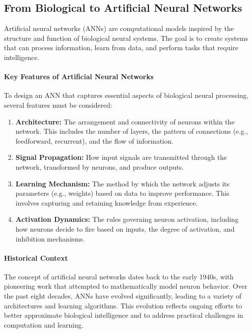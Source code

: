 \subsection{From Biological to Artificial Neural Networks}
\label{sec:perceptron_from_biological_to_artificial_neural_networks}

Artificial neural networks (ANNs) are computational models inspired by the structure and function of biological neural systems. The goal is to create systems that can process information, learn from data, and perform tasks that require intelligence.

\paragraph{Key Features of Artificial Neural Networks}

To design an ANN that captures essential aspects of biological neural processing, several features must be considered:

\begin{enumerate}
    \item \textbf{Architecture:} The arrangement and connectivity of neurons within the network. This includes the number of layers, the pattern of connections (e.g., feedforward, recurrent), and the flow of information.

    \item \textbf{Signal Propagation:} How input signals are transmitted through the network, transformed by neurons, and produce outputs.

    \item \textbf{Learning Mechanism:} The method by which the network adjusts its parameters (e.g., weights) based on data to improve performance. This involves capturing and retaining knowledge from experience.

    \item \textbf{Activation Dynamics:} The rules governing neuron activation, including how neurons decide to fire based on inputs, the degree of activation, and inhibition mechanisms.
\end{enumerate}

\paragraph{Historical Context}

The concept of artificial neural networks dates back to the early 1940s, with pioneering work that attempted to mathematically model neuron behavior. Over the past eight decades, ANNs have evolved significantly, leading to a variety of architectures and learning algorithms. This evolution reflects ongoing efforts to better approximate biological intelligence and to address practical challenges in computation and learning.

